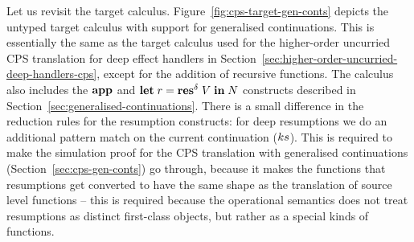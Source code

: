 \documentclass[12pt,phd,lfcs,twoside,openright,logo,leftchapter,normalheadings]{infthesis}
\theoremstyle{plain}
\theoremstyle{definition}
\begin{document}
Let us revisit the target
calculus. Figure~\ref{fig:cps-target-gen-conts} depicts the untyped
target calculus with support for generalised continuations.
%
This is essentially the same as the target calculus used for the
higher-order uncurried CPS translation for deep effect handlers in
Section~\ref{sec:higher-order-uncurried-deep-handlers-cps}, except for
the addition of recursive functions. The calculus also includes the
$\mathbf{app}$ and $\mathbf{let}\;r=\mathbf{res}^\delta\;V\;\mathbf{in}\;N$ constructs described in
Section~\ref{sec:generalised-continuations}. There is a small
difference in the reduction rules for the resumption constructs: for
deep resumptions we do an additional pattern match on the current
continuation ($ks$). This is required to make the simulation proof
for the CPS translation with generalised continuations
(Section~\ref{sec:cps-gen-conts}) go through, because it makes the
functions that resumptions get converted to have the same shape as the
translation of source level functions -- this is required because the
operational semantics does not treat resumptions as distinct
first-class objects, but rather as a special kinds of functions.
\end{document}
